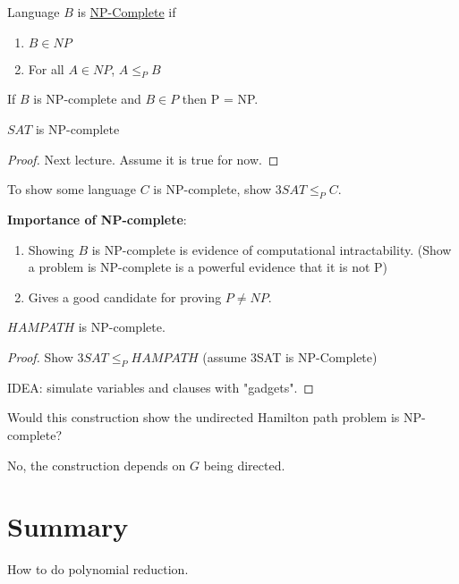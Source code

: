 \begin{definition}
    Language \(B\) is  \underline{NP-Complete}  if
    \begin{enumerate}
        \item \(B \in NP\) 
        \item For all \(A \in NP\), \(A \leq_P B\)  
    \end{enumerate}
\end{definition}

If \(B\) is NP-complete and \(B \in P\) then P = NP. 

\begin{theorem}
    \(SAT\) is NP-complete 
\end{theorem}
\begin{proof}
    Next lecture. Assume it is true for now.
\end{proof}


\begin{note}
    To show some language \(C\) is NP-complete, show \(3SAT \leq_P C\). 
\end{note}


\textbf{Importance of NP-complete}:
\begin{enumerate}
    \item Showing \(B\) is NP-complete is evidence of computational intractability.
    (Show a problem is NP-complete is a powerful evidence that it is not P)
    \item Gives a good candidate for proving \(P \neq NP\).  
\end{enumerate} 

\begin{theorem}
    \(HAMPATH\) is NP-complete. 
\end{theorem}
\begin{proof}
    Show \(3SAT \leq_P HAMPATH\) (assume 3SAT is NP-Complete) 

    IDEA: simulate variables and clauses with "gadgets".


\end{proof}

\begin{remark}
    Would this construction show the undirected Hamilton path problem is NP-complete?

    No, the construction depends on \(G\) being directed. 
\end{remark}

\section{Summary}
How to do polynomial reduction.